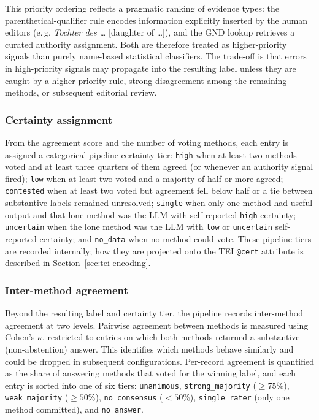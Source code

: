 \documentclass{eceasst}
\newcommand{\eg}{e.\,g.}
\begin{document}
This priority ordering reflects a pragmatic ranking of evidence types: the parenthetical-qualifier rule encodes information explicitly inserted by the human editors (\eg{} \emph{Tochter des \dots} [daughter of \dots]), and the GND lookup retrieves a curated authority assignment. Both are therefore treated as higher-priority signals than purely name-based statistical classifiers. The trade-off is that errors in high-priority signals may propagate into the resulting label unless they are caught by a higher-priority rule, strong disagreement among the remaining methods, or subsequent editorial review.

\subsubsection{Certainty assignment} From the agreement score and the number of voting methods, each entry is assigned a categorical pipeline certainty tier: \texttt{high} when at least two methods voted and at least three quarters of them agreed (or whenever an authority signal fired); \texttt{low} when at least two voted and a majority of half or more agreed; \texttt{contested} when at least two voted but agreement fell below half or a tie between substantive labels remained unresolved; \texttt{single} when only one method had useful output and that lone method was the LLM with self-reported \texttt{high} certainty; \texttt{uncertain} when the lone method was the LLM with \texttt{low} or \texttt{uncertain} self-reported certainty; and \texttt{no\_data} when no method could vote. These pipeline tiers are recorded internally; how they are projected onto the TEI \texttt{@cert} attribute is described in Section~\ref{sec:tei-encoding}.

\subsubsection{Inter-method agreement}
Beyond the resulting label and certainty tier, the pipeline records inter-method agreement at two levels. Pairwise agreement between methods is measured using Cohen's $\kappa$, restricted to entries on which both methods returned a substantive (non-abstention) answer. This identifies which methods behave similarly and could be dropped in subsequent configurations. Per-record agreement is quantified as the share of answering methods that voted for the winning label, and each entry is sorted into one of six tiers: \texttt{unanimous}, \texttt{strong\-\_majority} ($\geq 75\%$), \texttt{weak\_majority} ($\geq 50\%$), \texttt{no\_consensus} ($< 50\%$), \texttt{single\-\_rater} (only one method committed), and \texttt{no\_answer}.
\end{document}
